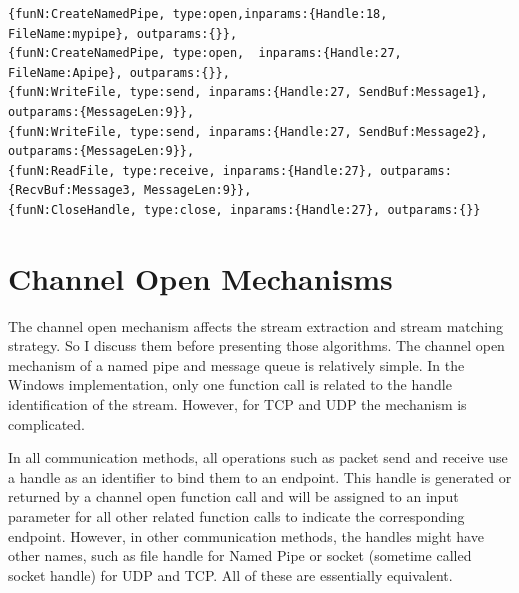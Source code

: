 \documentclass[12pt,oneside]{book}
\providecommand{\DIFaddbegin}{} %
\providecommand{\DIFaddend}{} %
\providecommand{\DIFdelbegin}{} %
\providecommand{\DIFdelend}{} %
\newcommand{\DIFscaledelfig}{0.5}
\newlength{\DIFdelgraphicswidth} %
\newlength{\DIFdelgraphicsheight} %
\newcommand{\DIFaddincludegraphics}[2][]{{\color{blue}\fbox{\DIFOincludegraphics[#1]{#2}}}} %
\newcommand{\DIFdelincludegraphics}[2][]{%
\sbox{\DIFdelgraphicsbox}{\DIFOincludegraphics[#1]{#2}}%
\settoboxwidth{\DIFdelgraphicswidth}{\DIFdelgraphicsbox} %
\settoboxtotalheight{\DIFdelgraphicsheight}{\DIFdelgraphicsbox} %
\scalebox{\DIFscaledelfig}{%
\parbox[b]{\DIFdelgraphicswidth}{\usebox{\DIFdelgraphicsbox}\\[-\baselineskip] \rule{\DIFdelgraphicswidth}{0em}}\llap{\resizebox{\DIFdelgraphicswidth}{\DIFdelgraphicsheight}{%
\setlength{\unitlength}{\DIFdelgraphicswidth}%
\begin{picture}(1,1)%
\thicklines\linethickness{2pt} %
{\color[rgb]{1,0,0}\put(0,0){\framebox(1,1){}}}%
{\color[rgb]{1,0,0}\put(0,0){\line( 1,1){1}}}%
{\color[rgb]{1,0,0}\put(0,1){\line(1,-1){1}}}%
\end{picture}%
}\hspace*{3pt}}} %
} %
\DeclareRobustCommand{\DIFaddbegin}{\DIFOaddbegin \let\includegraphics\DIFaddincludegraphics} %
\DeclareRobustCommand{\DIFaddend}{\DIFOaddend \let\includegraphics\DIFOincludegraphics} %
\DeclareRobustCommand{\DIFdelbegin}{\DIFOdelbegin \let\includegraphics\DIFdelincludegraphics} %
\DeclareRobustCommand{\DIFdelend}{\DIFOaddend \let\includegraphics\DIFOincludegraphics} %
\begin{document}
\DIFdelbegin %
\DIFdelend \DIFaddbegin \begin{lstlisting}[caption= Example of  $etr$, label=eventsexample]
{funN:CreateNamedPipe, type:open,inparams:{Handle:18, FileName:mypipe}, outparams:{}},
{funN:CreateNamedPipe, type:open,  inparams:{Handle:27,  FileName:Apipe}, outparams:{}},
{funN:WriteFile, type:send, inparams:{Handle:27, SendBuf:Message1}, outparams:{MessageLen:9}},
{funN:WriteFile, type:send, inparams:{Handle:27, SendBuf:Message2}, outparams:{MessageLen:9}},
{funN:ReadFile, type:receive, inparams:{Handle:27}, outparams:{RecvBuf:Message3, MessageLen:9}},
{funN:CloseHandle, type:close, inparams:{Handle:27}, outparams:{}}
\end{lstlisting}
\DIFaddend 

\section{Channel Open Mechanisms}\label{mecha}
The channel open mechanism affects the stream extraction and stream matching strategy. So I discuss them before presenting those algorithms. The channel open mechanism of a named pipe and message queue is relatively simple. In the Windows implementation, only one function call is related to the handle identification of the stream. However, for TCP and UDP the mechanism is complicated.

In all communication methods, all operations such as packet send and receive use a handle as an identifier to bind them to an endpoint. This handle is generated or returned by a channel open function call and will be assigned to an input parameter for all other related function calls to indicate the corresponding endpoint. However, in other communication methods, the handles might have other names, such as file handle for Named Pipe or socket (sometime called socket handle) for UDP and TCP. All of these are essentially equivalent.
\end{document}
